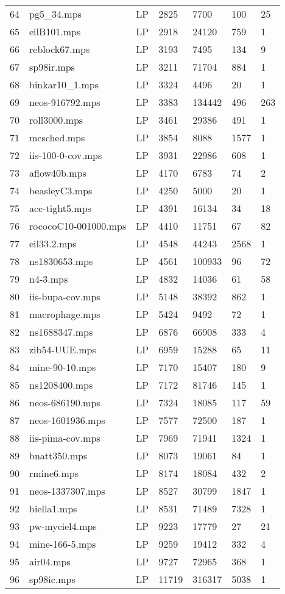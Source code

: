 \documentclass{article}
\begin{document}
\begin{longtable}{|l |l |l |l |l |l |l |}
64&pg5_34.mps&LP&2825&7700&100&25\\
65&eilB101.mps&LP&2918&24120&759&1\\
66&reblock67.mps&LP&3193&7495&134&9\\
67&sp98ir.mps&LP&3211&71704&884&1\\
68&binkar10_1.mps&LP&3324&4496&20&1\\
69&neos-916792.mps&LP&3383&134442&496&263\\
70&roll3000.mps&LP&3461&29386&491&1\\
71&mcsched.mps&LP&3854&8088&1577&1\\
72&iis-100-0-cov.mps&LP&3931&22986&608&1\\
73&aflow40b.mps&LP&4170&6783&74&2\\
74&beasleyC3.mps&LP&4250&5000&20&1\\
75&acc-tight5.mps&LP&4391&16134&34&18\\
76&rococoC10-001000.mps&LP&4410&11751&67&82\\
77&eil33.2.mps&LP&4548&44243&2568&1\\
78&ns1830653.mps&LP&4561&100933&96&72\\
79&n4-3.mps&LP&4832&14036&61&58\\
80&iis-bupa-cov.mps&LP&5148&38392&862&1\\
81&macrophage.mps&LP&5424&9492&72&1\\
82&ns1688347.mps&LP&6876&66908&333&4\\
83&zib54-UUE.mps&LP&6959&15288&65&11\\
84&mine-90-10.mps&LP&7170&15407&180&9\\
85&ns1208400.mps&LP&7172&81746&145&1\\
86&neos-686190.mps&LP&7324&18085&117&59\\
87&neos-1601936.mps&LP&7577&72500&187&1\\
88&iis-pima-cov.mps&LP&7969&71941&1324&1\\
89&bnatt350.mps&LP&8073&19061&84&1\\
90&rmine6.mps&LP&8174&18084&432&2\\
91&neos-1337307.mps&LP&8527&30799&1847&1\\
92&biella1.mps&LP&8531&71489&7328&1\\
93&pw-myciel4.mps&LP&9223&17779&27&21\\
94&mine-166-5.mps&LP&9259&19412&332&4\\
95&air04.mps&LP&9727&72965&368&1\\
96&sp98ic.mps&LP&11719&316317&5038&1\\

\end{longtable}
\end{document}
